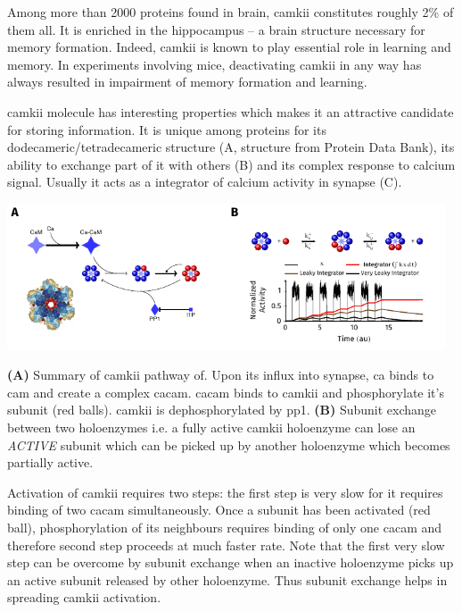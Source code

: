 \documentclass[]{resonance}
\begin{document}
 {
    Among more than 2000 proteins found in brain, \gls{camkii} constitutes
    roughly 2\% of them all. It is enriched in the hippocampus -- a brain
    structure necessary for memory formation. Indeed, \gls{camkii} is known to
    play essential role in learning and memory. In experiments involving mice,
    deactivating \gls{camkii} in any way has always resulted in impairment of
    memory formation and learning. 

    \gls{camkii} molecule has interesting properties which makes it an
    attractive candidate for storing information. It is unique among proteins
    for its dodecameric/tetradecameric structure (A, structure from Protein Data Bank),
    its ability to exchange part of it with others (B) and its complex response
    to calcium signal.  Usually it acts as a integrator of calcium activity in
    synapse (C).

    \includegraphics[width=13cm]{./camkii_properties.pdf}

    \textbf{(A)} Summary of \gls{camkii} pathway of. Upon its influx into
    synapse, \gls{ca} binds to \gls{cam} and create a complex \gls{cacam}.
    \gls{cacam} binds to \gls{camkii} and phosphorylate it's subunit (red
    balls). \gls{camkii} is dephosphorylated by \gls{pp1}. \textbf{(B)} Subunit
    exchange between two holoenzymes i.e. a fully active \gls{camkii} holoenzyme
    can lose an \textit{ACTIVE} subunit which can be picked up by another
    holoenzyme which becomes partially active. 
    
    Activation of \gls{camkii} requires two steps: the first step is very slow
    for it requires binding of two \gls{cacam} simultaneously. Once a subunit
    has been activated (red ball), phosphorylation of its neighbours requires
    binding of only one \gls{cacam} and therefore second step proceeds at  much
    faster rate.  Note that the first very slow step can be overcome by subunit
    exchange when an inactive holoenzyme picks up an active subunit released by
    other holoenzyme. Thus subunit exchange helps in spreading \gls{camkii}
    activation. 

}
\end{document}
